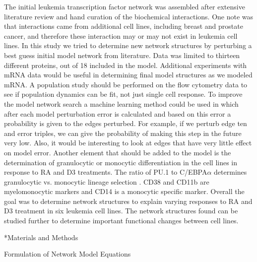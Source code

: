 \documentclass[12pt]{article}
\makeatletter
\renewcommand\subsection{\@startsection
	{subsection}{2}{0mm}
	{-0.05in}
	{-0.5\baselineskip}
	{\normalfont\normalsize\bfseries}}
\renewcommand\section{\@startsection
	{subsection}{2}{0mm}
	{-0.2in}
	{0.05\baselineskip}
	{\normalfont\large\bfseries}}
\makeatother
\begin{document}
The initial leukemia transcription factor network was assembled after extensive literature review and hand curation of the biochemical interactions. 
One note was that interactions came from additional cell lines, including breast and prostate cancer, and therefore these interaction may or may not exist in leukemia cell lines.
In this study we tried to determine new network structures by perturbing a best guess initial model network from literature.
Data was limited to thirteen different proteins, out of 18 included in the model.
Additional experiments with mRNA data would be useful in determining final model structures as we modeled mRNA.
A population study should be performed on the flow cytometry data to see if population dynamics can be fit, not just single cell response.
To improve the model network search a machine learning method could be used in which after each model perturbation error is calculated and based on this error a probability is given to the edges perturbed.
For example, if we perturb edge ten and error triples, we can give the probability of making this step in the future very low. 
Also, it would be interesting to look at edges that have very little effect on model error. 
Another element that should be added to the model is the determination of granulocytic or monocytic differentiation in the cell lines in response to RA and D3 treatments. 
The ratio of PU.1 to C/EBPA$\alpha$ determines granulocytic vs. monocytic lineage selection \cite{Dahl2003}.
CD38 and CD11b are myelomonocytic markers and CD14 is a monocytic specific marker.
Overall the goal was to determine network structures to explain varying responses to RA and D3 treatment in six leukemia cell lines.
The network structures found can be studied further to determine important functional changes between cell lines.


\section*{Materials and Methods}

\subsection{Formulation of Network Model Equations}
\end{document}
